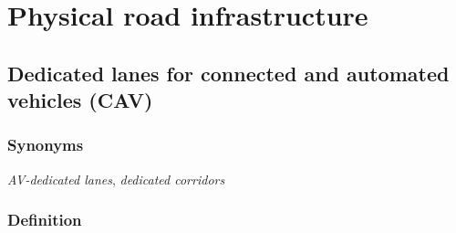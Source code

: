 \documentclass[
]{book}
\begin{document}
\hypertarget{infrastructure}{%
\chapter{Physical road infrastructure}\label{infrastructure}}

\hypertarget{dedicated_lanes}{%
\section{Dedicated lanes for connected and automated vehicles (CAV)}\label{dedicated_lanes}}

\hypertarget{synonyms}{%
\subsection*{Synonyms}\label{synonyms}}

\emph{AV-dedicated lanes}, \emph{dedicated corridors}

\hypertarget{definition}{%
\subsection*{Definition}\label{definition}}
\end{document}
